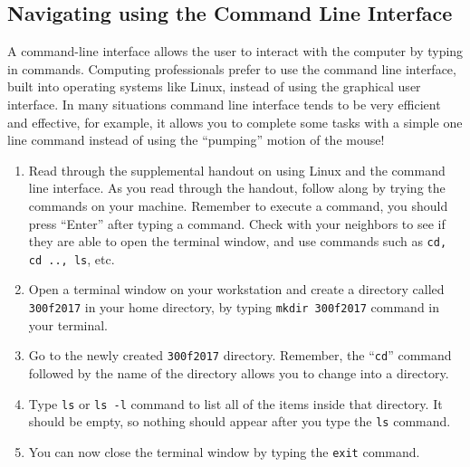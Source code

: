 \vspace*{-.2in}
\subsection*{Navigating using the Command Line Interface}
\vspace*{-.1in}
A command-line interface allows the user to interact with the computer by typing in commands. Computing professionals prefer to use the command line interface, built into operating systems like Linux, instead of using the graphical user interface. In many situations command line interface tends to be very efficient and effective, for example, it allows you to complete some tasks with a simple one line command instead of using the ``pumping'' motion of the mouse!
\vspace*{-.1in}
\begin{enumerate}
\item Read through the supplemental handout on using Linux and the command line interface. As you read through the handout, follow along by trying the commands on your machine. Remember to execute a command, you should press ``Enter'' after typing a command. Check with your neighbors to see if they are able to open the terminal window, and use commands such as {\tt cd, cd .., ls}, etc.
\item Open a terminal window on your workstation and create a directory  called {\tt 300f2017}  in your home directory, by typing {\tt mkdir 300f2017} command in your terminal.  
\item Go to the newly created {\tt 300f2017} directory. Remember, the ``{\tt cd}'' command followed by the name of the directory allows you to change into a directory.
\item Type {\tt ls} or {\tt ls -l} command to list all of the items inside that directory. It should be empty, so nothing should appear after you type the {\tt ls} command.
\item You can now close the terminal window by typing the {\tt exit} command. 
\end{enumerate}

\vspace*{-.2in}
